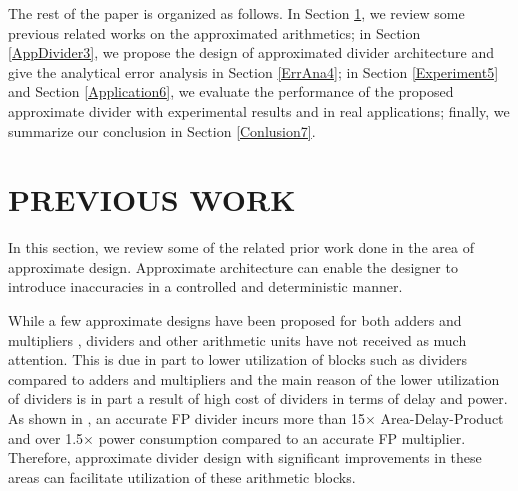 \documentclass[conference]{IEEEtran}
\begin{document}
The rest of the paper is organized as follows. In Section \ref{PreviousWork2}, we review some previous related works on the approximated arithmetics; in Section \ref{AppDivider3}, we propose the design of approximated divider architecture and give the analytical error analysis in Section \ref{ErrAna4}; in Section \ref{Experiment5} and Section \ref{Application6}, we evaluate the performance of the proposed approximate divider with experimental results and in real applications; finally, we summarize our conclusion in Section \ref{Conlusion7}.

\section{PREVIOUS WORK}
\label{PreviousWork2}
In this section, we review some of the related prior work done in the area of approximate design. Approximate architecture can enable the designer to introduce inaccuracies in a controlled and deterministic manner.

While a few approximate designs have been proposed for both adders and multipliers \cite{VGupta2013,SHashemi2015,HMahdiani2010,CTChen}, dividers and other arithmetic units have
not received as much attention. This is due in part to lower utilization of blocks such as dividers compared to adders and multipliers and
the main reason of the lower utilization of dividers is in part a result of high cost of dividers in terms
of delay and power. As shown in \cite{HSaadat1}, an accurate FP divider incurs more than 15$\times$ Area-Delay-Product and over 1.5$\times$ power consumption
compared to an accurate FP multiplier. Therefore, approximate divider design with significant improvements in these areas can facilitate utilization of
these arithmetic blocks.
\end{document}
